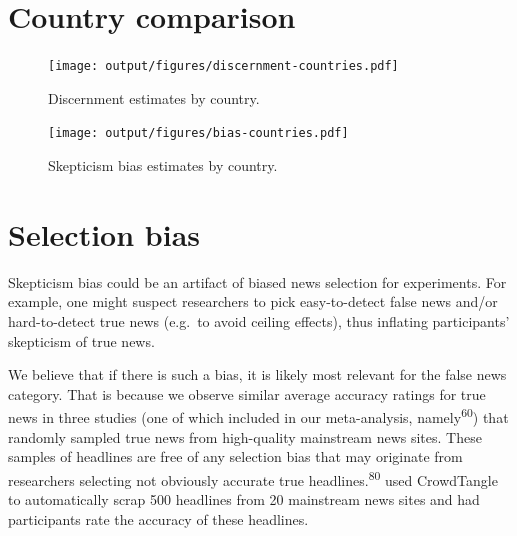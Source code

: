 \documentclass[
  doc,floatsintext]{apa6}
\begin{document}
\clearpage

\section{Country comparison}\label{country-comparison}

\FloatBarrier



\begin{figure}
\centering
\texttt{[image: output/figures/discernment-countries.pdf]}
\caption{\label{fig:discernment-countries}Discernment estimates by country.}
\end{figure}



\begin{figure}
\centering
\texttt{[image: output/figures/bias-countries.pdf]}
\caption{\label{fig:bias-countries}Skepticism bias estimates by country.}
\end{figure}

\clearpage

\section{Selection bias}\label{selection-bias}

Skepticism bias could be an artifact of biased news selection for experiments. For example, one might suspect researchers to pick easy-to-detect false news and/or hard-to-detect true news (e.g.~to avoid ceiling effects), thus inflating participants' skepticism of true news.

We believe that if there is such a bias, it is likely most relevant for the false news category. That is because we observe similar average accuracy ratings for true news in three studies (one of which included in our meta-analysis, namely\textsuperscript{60}) that randomly sampled true news from high-quality mainstream news sites. These samples of headlines are free of any selection bias that may originate from researchers selecting not obviously accurate true headlines.\textsuperscript{80} used CrowdTangle to automatically scrap 500 headlines from 20 mainstream news sites and had participants rate the accuracy of these headlines.
\end{document}
